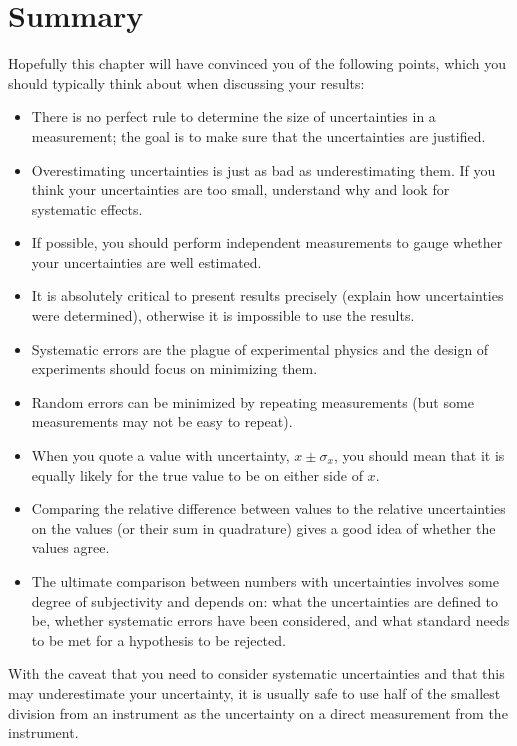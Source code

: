 \section{Summary}
\vspace{0.5cm}
\begin{chapterSummary}
Hopefully this chapter will have convinced you of the following points, which you should typically think about when discussing your results:
\begin{itemize}
\item There is no perfect rule to determine the size of uncertainties in a measurement; the goal is to make sure that the uncertainties are justified.
\item Overestimating uncertainties is just as bad as underestimating them. If you think your uncertainties are too small, understand why and look for systematic effects.
\item If possible, you should perform independent measurements to gauge whether your uncertainties are well estimated.
\item It is absolutely critical to present results precisely (explain how uncertainties were determined), otherwise it is impossible to use the results.
\item Systematic errors are the plague of experimental physics and the design of experiments should focus on minimizing them.
\item Random errors can be minimized by repeating measurements (but some measurements may not be easy to repeat).
\item When you quote a value with uncertainty, $x\pm\sigma_x$, you should mean that it is equally likely for the true value to be on either side of $x$.
\item Comparing the relative difference between values to the relative uncertainties on the values (or their sum in quadrature) gives a good idea of whether the values agree.
\item The ultimate comparison between numbers with uncertainties involves some degree of subjectivity and depends on: what the uncertainties are defined to be, whether systematic errors have been considered, and what standard needs to be met for a hypothesis to be rejected.
\end{itemize}

With the caveat that you need to consider systematic uncertainties and that this may underestimate your uncertainty, it is usually safe to use half of the smallest division from an instrument as the uncertainty on a direct measurement from the instrument. 


\end{chapterSummary}
